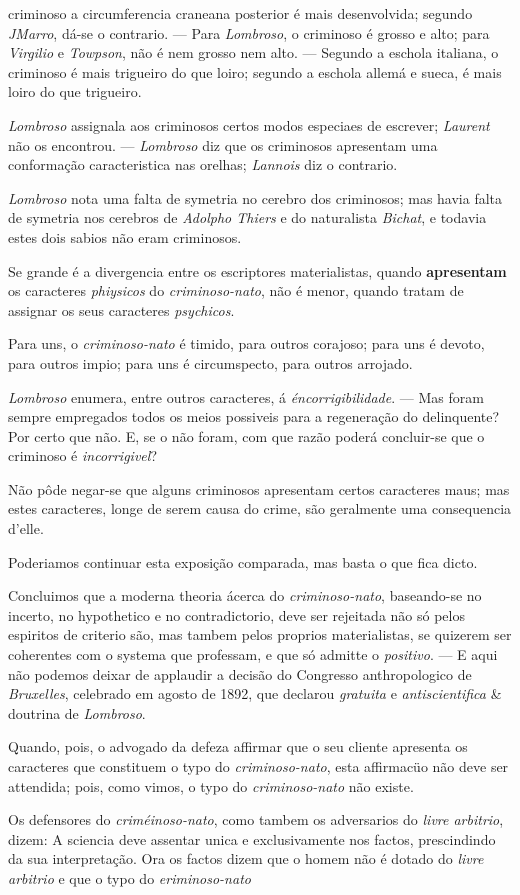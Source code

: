 criminoso a circumferencia craneana posterior é mais desenvolvida; segundo \emph{JMarro}, dá-se o contrario. --- Para \emph{Lombroso}, o criminoso é grosso e alto; para \emph{Virgilio} e \emph{Towpson}, não é nem grosso nem alto. --- Segundo a eschola italiana, o criminoso é mais trigueiro do que loiro; segundo a eschola allemá e sueca, é mais loiro do que trigueiro.\par \emph{Lombroso} assignala aos criminosos certos modos especiaes de escrever; \emph{Laurent} não os encontrou. --- \emph{Lombroso} diz que os criminosos apresentam uma conformação caracteristica nas orelhas; \emph{Lannois} diz o contrario.\par \emph{Lombroso} nota uma falta de symetria no cerebro dos criminosos; mas havia falta de symetria nos cerebros de \emph{Adolpho Thiers} e do naturalista \emph{Bichat}, e todavia estes dois sabios não eram criminosos.\par Se grande é a divergencia entre os escriptores materialistas, quando \textbf{apresentam} os caracteres \emph{phiysicos} do \emph{criminoso-nato}, não é menor, quando tratam de assignar os seus caracteres \emph{psychicos}.\par Para uns, o \emph{criminoso-nato} é timido, para outros corajoso; para uns é devoto, para outros impio; para uns é circumspecto, para outros arrojado.\par \emph{Lombroso} enumera, entre outros caracteres, á \emph{éncorrigibilidade}. --- Mas foram sempre empregados todos os meios possiveis para a regeneração do delinquente? Por certo que não. E, se o não foram, com que razão poderá concluir-se que o criminoso é \emph{incorrigivel}?\par Não pôde negar-se que alguns criminosos apresentam certos caracteres maus; mas estes caracteres, longe de serem causa do crime, são geralmente uma consequencia d'elle.\par Poderiamos continuar esta exposição comparada, mas basta o que fica dicto.\par Concluimos que a moderna theoria ácerca do \emph{criminoso-nato}, baseando-se no incerto, no hypothetico e no contradictorio, deve ser rejeitada não só pelos espiritos de criterio são, mas tambem pelos proprios materialistas, se quizerem ser coherentes com o systema que professam, e que só admitte o \emph{positivo}. --- E aqui não podemos deixar de applaudir a decisão do Congresso anthropologico de \emph{Bruxelles}, celebrado em agosto de 1892, que declarou \emph{gratuita} e \emph{antiscientifica} \& doutrina de \emph{Lombroso}.\par Quando, pois, o advogado da defeza affirmar que o seu cliente apresenta os caracteres que constituem o typo do \emph{criminoso-nato}, esta affirmacüo não deve ser attendida; pois, como vimos, o typo do \emph{criminoso-nato} não existe.\par Os defensores do \emph{criméinoso-nato}, como tambem os adversarios do \emph{livre arbitrio}, dizem: A sciencia deve assentar unica e exclusivamente nos factos, prescindindo da sua interpretação. Ora os factos dizem que o homem não é dotado do \emph{livre arbitrio} e que o typo do \emph{eriminoso-nato} 